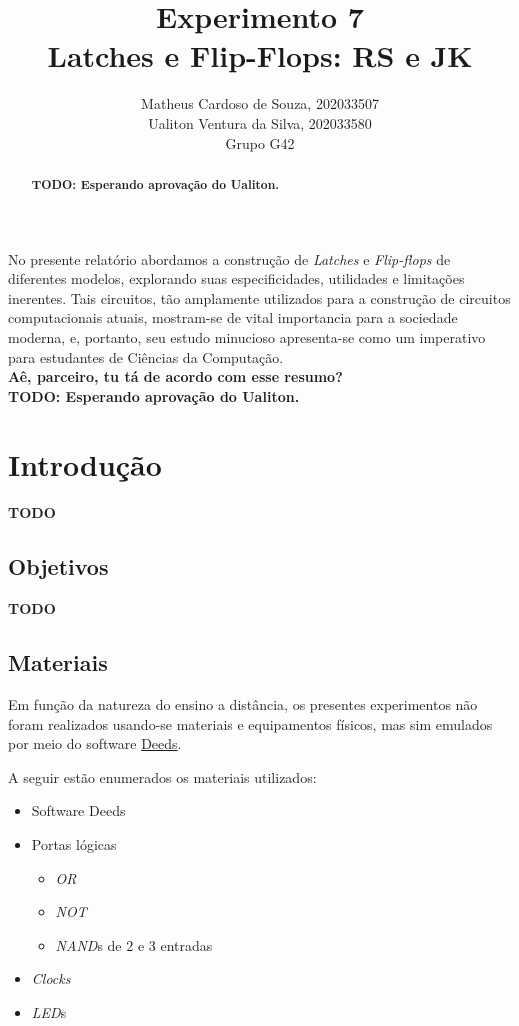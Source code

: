\documentclass[12pt]{article}
\title{Experimento 7\\
Latches e Flip-Flops: RS e JK}
\author{Matheus Cardoso de Souza, 202033507\\
        Ualiton Ventura da Silva, 202033580\\
        Grupo G42
}
\begin{document}
\maketitle

 \begin{abstract}
   \textbf{TODO: Esperando aprovação do Ualiton.}
 \end{abstract}

 \begin{resumo}
   No presente relatório abordamos a construção de \emph{Latches} e
   \emph{Flip-flops} de diferentes modelos, explorando suas especificidades,
   utilidades e limitações inerentes. Tais circuitos, tão amplamente utilizados
   para a construção de circuitos computacionais atuais, mostram-se de vital
   importancia para a sociedade moderna, e, portanto, seu estudo minucioso
   apresenta-se como um imperativo para estudantes de Ciências da Computação.
   \\
   \textbf{Aê, parceiro, tu tá de acordo com esse resumo?}\\
   \textbf{TODO: Esperando aprovação do Ualiton.}\\
 \end{resumo}


\section{Introdução}\label{sec:Introducao}

\textbf{TODO}

\subsection{Objetivos}\label{sec:Objetivos}

\textbf{TODO}

\subsection{Materiais}\label{sec:Materiais}

Em função da natureza do ensino a distância, os presentes experimentos não foram
realizados usando-se materiais e equipamentos físicos, mas sim emulados por meio
do software
\href{https://www.digitalelectronicsdeeds.com/downloads.html}{Deeds}.

A seguir estão enumerados os materiais utilizados:
\begin{itemize}
    \item Software Deeds
    \item Portas lógicas
    \begin{itemize}
      \item \emph{OR}
      \item \emph{NOT}
      \item \emph{NAND}s de $2$ e $3$ entradas
    \end{itemize}
    \item \emph{Clocks}
    \item \emph{LED}s
\end{itemize}
\end{document}
